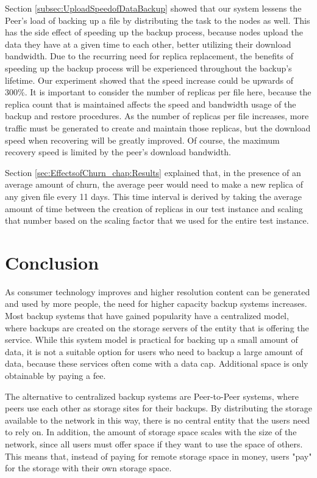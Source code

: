 \documentclass[12pt]{report}
\begin{document}
Section \ref{subsec:UploadSpeedofDataBackup} showed that our system lessens the Peer's load of backing up a file by distributing the task to the nodes as well. This has the side effect of speeding up the backup process, because nodes upload the data they have at a given time to each other, better utilizing their download bandwidth. Due to the recurring need for replica replacement, the benefits of speeding up the backup process will be experienced throughout the backup's lifetime. Our experiment showed that the speed increase could be upwards of 300\%. It is important to consider the number of replicas per file here, because the replica count that is maintained affects the speed and bandwidth usage of the backup and restore procedures. As the number of replicas per file increases, more traffic must be generated to create and maintain those replicas, but the download speed when recovering will be greatly improved. Of course, the maximum recovery speed is limited by the peer's download bandwidth.

Section \ref{sec:EffectsofChurn_chap:Results} explained that, in the presence of an average amount of churn, the average peer would need to make a new replica of any given file every 11 days. This time interval is derived by taking the average amount of time between the creation of replicas in our test instance and scaling that number based on the scaling factor that we used for the entire test instance.

\chapter{Conclusion} \label{chap:Conclusion}

As consumer technology improves and higher resolution content can be generated and used by more people, the need for higher capacity backup systems increases. Most backup systems that have gained popularity have a centralized model, where backups are created on the storage servers of the entity that is offering the service. While this system model is practical for backing up a small amount of data, it is not a suitable option for users who need to backup a large amount of data, because these services often come with a data cap. Additional space is only obtainable by paying a fee.

The alternative to centralized backup systems are Peer-to-Peer systems, where peers use each other as storage sites for their backups. By distributing the storage available to the network in this way, there is no central entity that the users need to rely on. In addition, the amount of storage space scales with the size of the network, since all users must offer space if they want to use the space of others. This means that, instead of paying for remote storage space in money, users "pay" for the storage with their own storage space.
\end{document}
